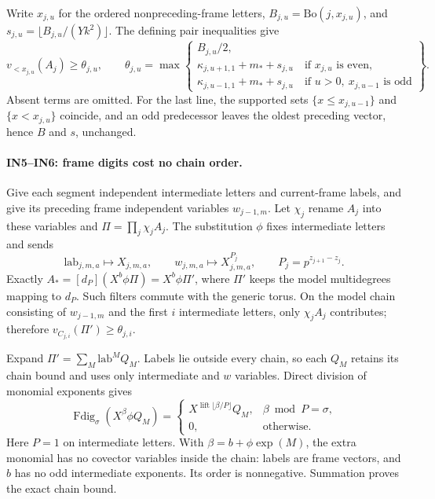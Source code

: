 \documentclass[11pt,a4paper]{article}
\numberwithin{equation}{section}
\theoremstyle{remark}\newtheorem{remark}[theorem]{Remark}
\begin{document}
Write $x_{j,u}$ for the ordered nonpreceding-frame letters,
$B_{j,u}=\mathrm{Bo}(j,x_{j,u})$, and
$s_{j,u}=\lfloor B_{j,u}/(Yk^2)\rfloor$.  The defining pair inequalities give
\[
 v_{<x_{j,u}}(A_j)\geq\theta_{j,u},\qquad
 \theta_{j,u}=\max\left\{
 \begin{array}{l}
 B_{j,u}/2,\\
 \kappa_{j,u+1,1}+m_*+s_{j,u}\quad\text{if }x_{j,u}\text{ is even},\\
 \kappa_{j,u-1,1}+m_*+s_{j,u}\quad\text{if }u>0,
                         \ x_{j,u-1}\text{ is odd}
 \end{array}\right\}.
 \tag{IN4}
\]
Absent terms are omitted.  For the last line, the supported sets
$\{x\leq x_{j,u-1}\}$ and $\{x<x_{j,u}\}$ coincide, and an odd
predecessor leaves the oldest preceding vector, hence $B$ and $s$, unchanged.

\paragraph{IN5--IN6: frame digits cost no chain order.}
Give each segment independent intermediate letters and current-frame
labels, and give its preceding frame independent variables $w_{j-1,m}$.
Let $\chi_j$ rename $A_j$ into these variables and
$\Pi=\prod_j\chi_jA_j$.  The substitution $\phi$ fixes intermediate letters
and sends
\[
 \mathrm{lab}_{j,m,a}\mapsto X_{j,m,a},\qquad
 w_{j,m,a}\mapsto X_{j,m,a}^{P_j},\qquad
 P_j=p^{z_{j+1}-z_j}.
\]
Exactly $A_*=[d_P](X^b\phi\Pi)=X^b\phi\Pi'$, where $\Pi'$ keeps
the model multidegrees mapping to $d_P$.  Such filters commute with
the generic torus.  On the model chain consisting of $w_{j-1,m}$ and
the first $i$ intermediate letters, only $\chi_jA_j$ contributes; therefore
$v_{C_{j,i}}(\Pi')\geq\theta_{j,i}$.

Expand $\Pi'=\sum_M\mathrm{lab}^M Q_M$.  Labels lie outside every chain,
so each $Q_M$ retains its chain bound and uses only intermediate and $w$
variables.  Direct division of monomial exponents gives
\[
 \operatorname{Fdig}_{\sigma}(X^\beta\phi Q_M)=
 \begin{cases}
 X^{\operatorname{lift}\lfloor\beta/P\rfloor}Q_M,
                   &\beta\bmod P=\sigma,\\
 0,&\text{otherwise}.
 \end{cases}
 \tag{IN5}
\]
Here $P=1$ on intermediate letters.  With $\beta=b+\phi\!\operatorname{exp}(M)$,
the extra monomial has no covector variables inside the chain: labels
are frame vectors, and $b$ has no odd intermediate exponents.
Its order is nonnegative.  Summation proves the exact chain bound.
\end{document}

